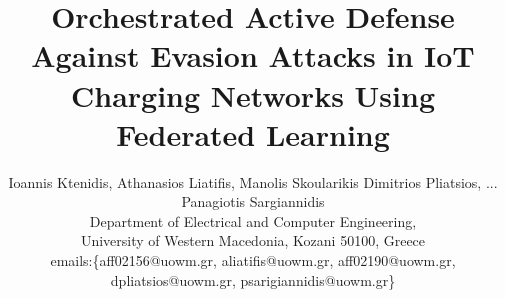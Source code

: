 \documentclass[10pt, a4paper, conference]{IEEEtran}
\begin{document}
\title{Orchestrated Active Defense Against Evasion Attacks in IoT Charging Networks Using Federated Learning}
\author{
Ioannis Ktenidis, 
Athanasios Liatifis, 
Manolis Skoularikis
Dimitrios Pliatsios,
...
Panagiotis Sargiannidis\\
Department of Electrical and Computer Engineering, \\University of Western Macedonia,
Kozani 50100, Greece\\
emails:\{aff02156@uowm.gr, aliatifis@uowm.gr, aff02190@uowm.gr, dpliatsios@uowm.gr, psarigiannidis@uowm.gr\}
}

\maketitle
\end{document}
